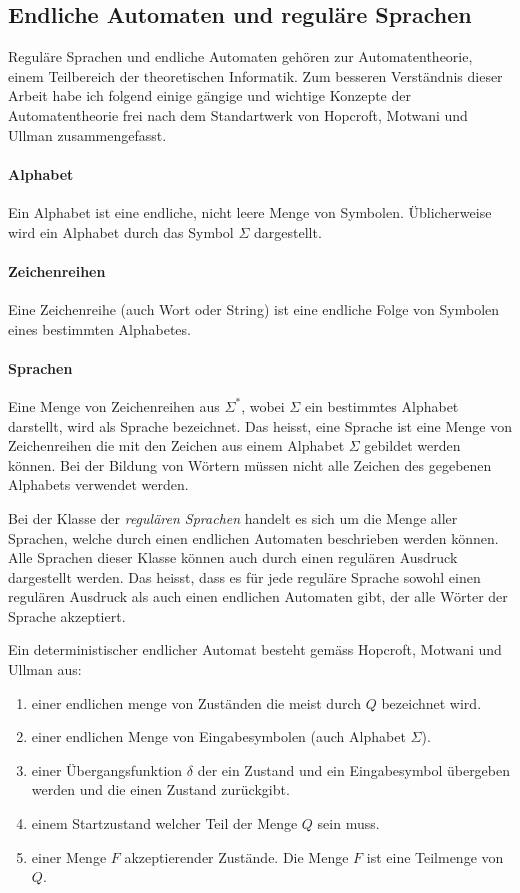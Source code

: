\subsection{Endliche Automaten und reguläre Sprachen}
Reguläre Sprachen und endliche Automaten gehören zur Automatentheorie, einem Teilbereich der theoretischen Informatik. Zum besseren Verständnis dieser Arbeit habe ich folgend einige gängige und wichtige Konzepte der Automatentheorie frei nach dem Standartwerk von Hopcroft, Motwani und Ullman zusammengefasst. \cite{hopcroft}
 
\paragraph{Alphabet}
Ein Alphabet ist eine endliche, nicht leere Menge von Symbolen. Üblicherweise wird ein Alphabet durch das Symbol $\Sigma$ dargestellt.
\paragraph{Zeichenreihen}
Eine Zeichenreihe (auch Wort oder String) ist eine endliche Folge von Symbolen eines bestimmten Alphabetes.
\paragraph{Sprachen}
Eine Menge von Zeichenreihen aus $\Sigma^*$, wobei $\Sigma$ ein bestimmtes Alphabet darstellt, wird als Sprache bezeichnet. Das heisst, eine Sprache ist eine Menge von Zeichenreihen die mit den Zeichen aus einem Alphabet $\Sigma$ gebildet werden können. Bei der Bildung von Wörtern müssen nicht alle Zeichen des gegebenen Alphabets verwendet werden.

Bei der Klasse der \textit{regulären Sprachen} handelt es sich um die Menge aller Sprachen, welche durch einen endlichen Automaten beschrieben werden können. Alle Sprachen dieser Klasse können auch durch einen regulären Ausdruck dargestellt werden. Das heisst, dass es für jede reguläre Sprache sowohl einen regulären Ausdruck als auch einen endlichen Automaten gibt, der alle Wörter der Sprache akzeptiert.

Ein deterministischer endlicher Automat besteht gemäss Hopcroft, Motwani und Ullman \cite{hopcroft} aus:
\begin{enumerate}
  \item einer endlichen menge von Zuständen die meist durch $Q$ bezeichnet wird.
  \item einer endlichen Menge von Eingabesymbolen (auch Alphabet $\Sigma$).
  \item einer Übergangsfunktion $\delta$ der ein Zustand und ein Eingabesymbol übergeben werden und die einen Zustand zurückgibt.
  \item einem Startzustand welcher Teil der Menge $Q$ sein muss.
  \item einer Menge $F$ akzeptierender Zustände. Die Menge $F$ ist eine Teilmenge von $Q$.
\end{enumerate}

